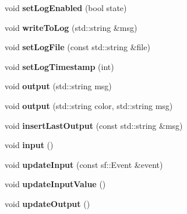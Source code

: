 \begin{DoxyCompactItemize}
\item 
void {\bfseries set\+Log\+Enabled} (bool state)\hypertarget{classConsole_ab73eef5e22ab9ef218dc63433fc418fa}{}\label{classConsole_ab73eef5e22ab9ef218dc63433fc418fa}

\item 
void {\bfseries write\+To\+Log} (std\+::string \&msg)\hypertarget{classConsole_a555537aaa8a953d0459efb2392eb74ac}{}\label{classConsole_a555537aaa8a953d0459efb2392eb74ac}

\item 
void {\bfseries set\+Log\+File} (const std\+::string \&file)\hypertarget{classConsole_ae135a01de6429f545532b933baf3c677}{}\label{classConsole_ae135a01de6429f545532b933baf3c677}

\item 
void {\bfseries set\+Log\+Timestamp} (int)\hypertarget{classConsole_a2063152a09b8fc481402fa2b91acf435}{}\label{classConsole_a2063152a09b8fc481402fa2b91acf435}

\item 
void {\bfseries output} (std\+::string msg)\hypertarget{classConsole_ae77795030b9a6f37f9745973d82176ef}{}\label{classConsole_ae77795030b9a6f37f9745973d82176ef}

\item 
void {\bfseries output} (std\+::string color, std\+::string msg)\hypertarget{classConsole_aacfc9448be616fd4459699db7a635551}{}\label{classConsole_aacfc9448be616fd4459699db7a635551}

\item 
void {\bfseries insert\+Last\+Output} (const std\+::string \&msg)\hypertarget{classConsole_ac8da15dab46dad5dc3c27fb8687a5fa9}{}\label{classConsole_ac8da15dab46dad5dc3c27fb8687a5fa9}

\item 
void {\bfseries input} ()\hypertarget{classConsole_a50056cdeafd8ccf150f3f7e00d077ff5}{}\label{classConsole_a50056cdeafd8ccf150f3f7e00d077ff5}

\item 
void {\bfseries update\+Input} (const sf\+::\+Event \&event)\hypertarget{classConsole_ae58f6f060dd09567347cfc6b00b923fa}{}\label{classConsole_ae58f6f060dd09567347cfc6b00b923fa}

\item 
void {\bfseries update\+Input\+Value} ()\hypertarget{classConsole_a78097e40392c525d82c77506ba501e7b}{}\label{classConsole_a78097e40392c525d82c77506ba501e7b}

\item 
void {\bfseries update\+Output} ()\hypertarget{classConsole_a4f513601e3fed552f8999ef8ec99ff02}{}\label{classConsole_a4f513601e3fed552f8999ef8ec99ff02}


\end{DoxyCompactItemize}
